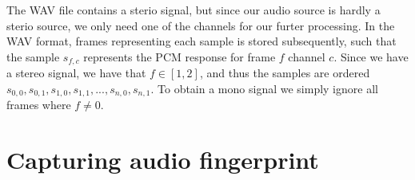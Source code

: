 The WAV file contains a sterio signal, but since our audio source is hardly a sterio source, we only need one of the channels for our furter processing.  
In the WAV format, frames representing each sample is stored subsequently, such that the sample \( s_{f,c} \) represents the PCM  response for frame \( f \) channel \( c \). 
Since we have a stereo signal, we have that \( f \in \left [ 1, 2 \right ]  \), and thus the samples are ordered  \( s_{0,0}, s_{0,1}, s_{1,0}, s_{1,1}, ... , s_{n,0}, s_{n,1} \). 
To obtain a mono signal we simply ignore all frames where \( f \neq 0 \).

\section{Capturing audio fingerprint}\label{sec:ch3_capturing_audio_fingerprint}
